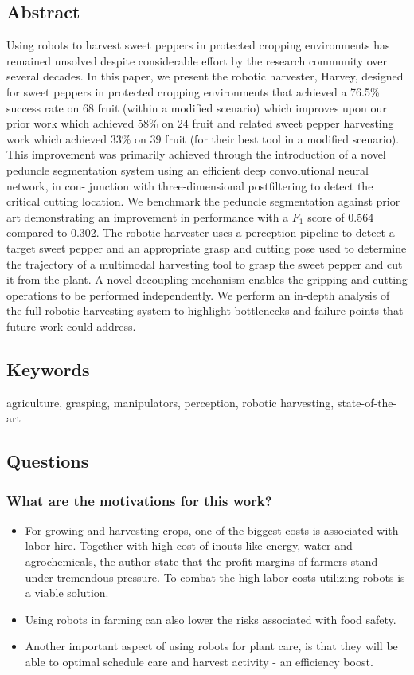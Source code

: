 \subsection*{Abstract}
Using robots to harvest sweet peppers in protected cropping environments has
remained unsolved despite considerable effort by the research community over
several decades. In this paper, we present the robotic harvester, Harvey, designed
for sweet peppers in protected cropping environments that achieved a 76.5\%
success rate on 68 fruit (within a modified scenario) which improves upon our prior
work which achieved 58\% on 24 fruit and related sweet pepper harvesting work
which achieved 33\% on 39 fruit (for their best tool in a modified scenario). This
improvement was primarily achieved through the introduction of a novel peduncle
segmentation system using an efficient deep convolutional neural network, in con-
junction with three‐dimensional postfiltering to detect the critical cutting location.
We benchmark the peduncle segmentation against prior art demonstrating
an improvement in performance with a $F_1$ score of 0.564 compared to 0.302. The
robotic harvester uses a perception pipeline to detect a target sweet pepper and an
appropriate grasp and cutting pose used to determine the trajectory of a multimodal
harvesting tool to grasp the sweet pepper and cut it from the plant. A novel
decoupling mechanism enables the gripping and cutting operations to be performed
independently. We perform an in‐depth analysis of the full robotic harvesting system
to highlight bottlenecks and failure points that future work could address.

\subsection*{Keywords}
agriculture, grasping, manipulators, perception, robotic harvesting, state-of-the-art


\subsection*{Questions}
\subsubsection*{What are the motivations for this work?}
\begin{itemize}
    \item For growing and harvesting crops, one of the biggest costs is associated with labor hire. Together with high cost of inouts like energy, water and agrochemicals, the author state that the profit margins of farmers stand under tremendous pressure. To combat the high labor costs utilizing robots is a viable solution.
    \item Using robots in farming can also lower the risks associated with food safety.
    \item Another important aspect of using robots for plant care, is that they will be able to optimal schedule care and harvest activity - an efficiency boost.
\end{itemize}
